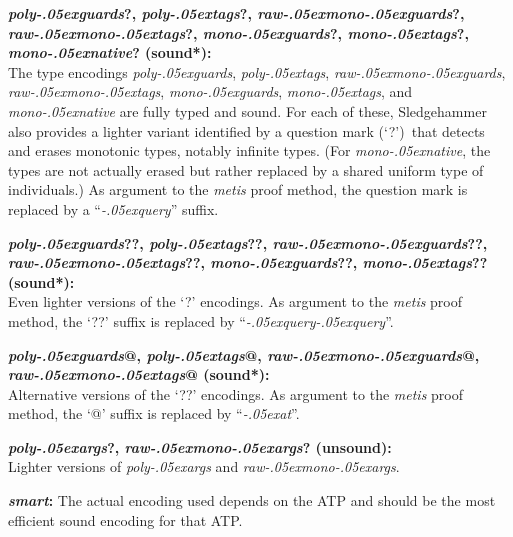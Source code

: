 \documentclass[a4paper,12pt]{article}
\renewcommand\_{\hbox{\textunderscore\kern-.05ex}}
\begin{document}
\begin{enum}
\begin{enum}
\item[\labelitemi]
\textbf{%
\textit{poly\_guards}?, \textit{poly\_tags}?, \textit{raw\_mono\_guards}?, \\
\textit{raw\_mono\_tags}?, \textit{mono\_guards}?, \textit{mono\_tags}?, \\
\textit{mono\_native}? (sound*):} \\
The type encodings \textit{poly\_guards}, \textit{poly\_tags},
\textit{raw\_mono\_guards}, \textit{raw\_mono\_tags}, \textit{mono\_guards},
\textit{mono\_tags}, and \textit{mono\_native} are fully typed and sound. For
each of these, Sledgehammer also provides a lighter variant identified by a
question mark (`\hbox{?}')\ that detects and erases monotonic types, notably
infinite types. (For \textit{mono\_native}, the types are not actually erased
but rather replaced by a shared uniform type of individuals.) As argument to the
\textit{metis} proof method, the question mark is replaced by a
\hbox{``\textit{\_query\/}''} suffix.

\item[\labelitemi]
\textbf{%
\textit{poly\_guards}??, \textit{poly\_tags}??, \textit{raw\_mono\_guards}??, \\
\textit{raw\_mono\_tags}??, \textit{mono\_guards}??, \textit{mono\_tags}?? \\
(sound*):} \\
Even lighter versions of the `\hbox{?}' encodings. As argument to the
\textit{metis} proof method, the `\hbox{??}' suffix is replaced by
\hbox{``\textit{\_query\_query\/}''}.

\item[\labelitemi]
\textbf{%
\textit{poly\_guards}@, \textit{poly\_tags}@, \textit{raw\_mono\_guards}@, \\
\textit{raw\_mono\_tags}@ (sound*):} \\
Alternative versions of the `\hbox{??}' encodings. As argument to the
\textit{metis} proof method, the `\hbox{@}' suffix is replaced by
\hbox{``\textit{\_at\/}''}.

\item[\labelitemi] \textbf{\textit{poly\_args}?, \textit{raw\_mono\_args}? (unsound):} \\
Lighter versions of \textit{poly\_args} and \textit{raw\_mono\_args}.

\item[\labelitemi] \textbf{\textit{smart}:} The actual encoding used depends on
the ATP and should be the most efficient sound encoding for that ATP.
\end{enum}


\end{enum}
\end{document}
